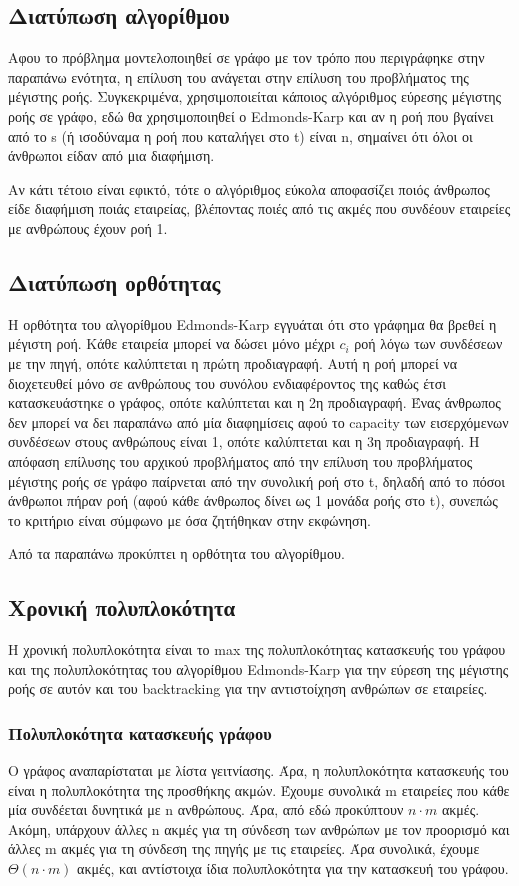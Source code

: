 \documentclass[a4paper,oneside, 11pt]{article}
\begin{document}
\subsection{Διατύπωση αλγορίθμου}
Αφου το πρόβλημα μοντελοποιηθεί σε γράφο με τον τρόπο που περιγράφηκε στην παραπάνω ενότητα, η επίλυση του ανάγεται στην επίλυση του προβλήματος της μέγιστης ροής. Συγκεκριμένα, χρησιμοποιείται κάποιος αλγόριθμος εύρεσης μέγιστης ροής σε γράφο, εδώ θα χρησιμοποιηθεί ο Edmonds-Karp και αν η ροή που βγαίνει από το s (ή ισοδύναμα η ροή που καταλήγει στο t) είναι n, σημαίνει ότι όλοι οι άνθρωποι είδαν από μια διαφήμιση. \bigbreak 

Αν κάτι τέτοιο είναι εφικτό, τότε ο αλγόριθμος εύκολα αποφασίζει ποιός άνθρωπος είδε διαφήμιση ποιάς εταιρείας, βλέποντας ποιές από τις ακμές που συνδέουν εταιρείες με ανθρώπους έχουν ροή 1.

\subsection{Διατύπωση ορθότητας}
Η ορθότητα του αλγορίθμου Edmonds-Karp εγγυάται ότι στο γράφημα θα βρεθεί η μέγιστη ροή. Κάθε εταιρεία μπορεί να δώσει μόνο μέχρι $c_i$ ροή λόγω των συνδέσεων με την πηγή, οπότε καλύπτεται η πρώτη προδιαγραφή. Αυτή η ροή μπορεί να διοχετευθεί μόνο σε ανθρώπους του συνόλου ενδιαφέροντος της καθώς έτσι κατασκευάστηκε ο γράφος, οπότε καλύπτεται και η 2η προδιαγραφή. Ένας άνθρωπος δεν μπορεί να δει παραπάνω από μία διαφημίσεις αφού το capacity των εισερχόμενων συνδέσεων στους ανθρώπους είναι 1, οπότε καλύπτεται και η 3η προδιαγραφή. Η απόφαση επίλυσης του αρχικού προβλήματος από την επίλυση του προβλήματος μέγιστης ροής σε γράφο παίρνεται από την συνολική ροή στο t, δηλαδή από το πόσοι άνθρωποι πήραν ροή (αφού κάθε άνθρωπος δίνει ως 1 μονάδα ροής στο t), συνεπώς το κριτήριο είναι σύμφωνο με όσα ζητήθηκαν στην εκφώνηση. \bigbreak 

Από τα παραπάνω προκύπτει η ορθότητα του αλγορίθμου.



\subsection{Χρονική πολυπλοκότητα}
Η χρονική πολυπλοκότητα είναι το max της πολυπλοκότητας κατασκευής του γράφου και της πολυπλοκότητας του αλγορίθμου Edmonds-Karp για την εύρεση της μέγιστης ροής σε αυτόν και του backtracking για την αντιστοίχηση ανθρώπων σε εταιρείες.
\subsubsection{Πολυπλοκότητα κατασκευής γράφου}
Ο γράφος αναπαρίσταται με λίστα γειτνίασης. Άρα, η πολυπλοκότητα κατασκευής του είναι η πολυπλοκότητα της προσθήκης ακμών. Έχουμε συνολικά m εταιρείες που κάθε μία συνδέεται δυνητικά με n ανθρώπους. Άρα, από εδώ προκύπτουν $n\cdot m$ ακμές. Ακόμη, υπάρχουν άλλες n ακμές για τη σύνδεση των ανθρώπων με τον προορισμό και άλλες m ακμές για τη σύνδεση της πηγής με τις εταιρείες. Άρα συνολικά, έχουμε
$\Theta(n\cdot m)$ ακμές, και αντίστοιχα ίδια πολυπλοκότητα για την κατασκευή του γράφου. \bigbreak 
\end{document}
